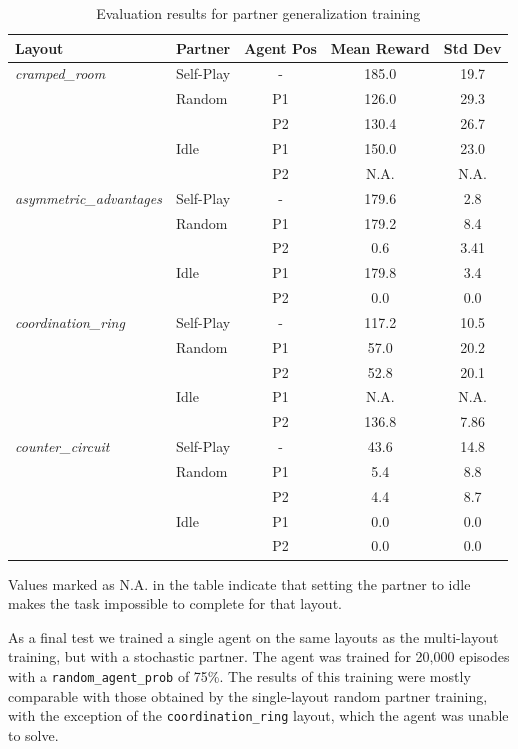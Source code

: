 \documentclass{article}
\begin{document}
\begin{table}[ht]
\centering
\caption{Evaluation results for partner generalization training}
\label{tab:partner_generalization_results}
\begin{tabular}{llccc}
\toprule
Layout & Partner & Agent Pos & Mean Reward & Std Dev \\
\midrule
\textit{cramped\_room} & Self-Play & - & 185.0 & 19.7 \\
 & Random & P1 & 126.0 & 29.3 \\
 & & P2 & 130.4 & 26.7 \\
 & Idle & P1 & 150.0 & 23.0 \\
 & & P2 & N.A. & N.A. \\
\midrule
\textit{asymmetric\_advantages} & Self-Play & - & 179.6 & 2.8 \\
 & Random & P1 & 179.2 & 8.4 \\
 & & P2 & 0.6 & 3.41 \\
 & Idle & P1 & 179.8 & 3.4 \\
 & & P2 & 0.0 & 0.0 \\
\midrule
\textit{coordination\_ring} & Self-Play & - & 117.2 & 10.5 \\
 & Random & P1 & 57.0 & 20.2 \\
 & & P2 & 52.8 & 20.1 \\
 & Idle & P1 & N.A. & N.A. \\
 & & P2 & 136.8 & 7.86 \\
\midrule
\textit{counter\_circuit} & Self-Play & - & 43.6 & 14.8 \\
 & Random & P1 & 5.4 & 8.8 \\
 & & P2 & 4.4 & 8.7 \\
 & Idle & P1 & 0.0 & 0.0 \\
 & & P2 & 0.0 & 0.0 \\

\bottomrule
\end{tabular}
\end{table}

Values marked as N.A. in the table indicate that setting the partner to idle makes the task impossible to complete for that layout.

As a final test we trained a single agent on the same layouts as the multi-layout training, but with a stochastic partner. The agent was trained for 20,000 episodes with a \texttt{random\_agent\_prob} of 75\%. The results of this training were mostly comparable with those obtained by the single-layout random partner training, with the exception of the \texttt{coordination\_ring} layout, which the agent was unable to solve. 
\end{document}
